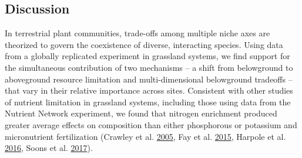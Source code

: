 \documentclass[twoside,12pt,final]{ucthesis-CA2012}
\begin{document}
\begin{ucmainmatter}
{\section{Discussion}\label{discussion}}

In terrestrial plant communities, trade-offs among multiple niche axes are theorized to govern the coexistence of diverse, interacting species. Using data from a globally replicated experiment in grassland systems, we find support for the simultaneous contribution of two mechanisms -- a shift from belowground to aboveground resource limitation and multi-dimensional belowground tradeoffs -- that vary in their relative importance across sites.
Consistent with other studies of nutrient limitation in grassland systems, including those using data from the Nutrient Network experiment, we found that nitrogen enrichment produced greater average effects on composition than either phosphorous or potassium and micronutrient fertilization (Crawley et al. \protect\hyperlink{ref-Crawley2005}{2005}, Fay et al. \protect\hyperlink{ref-Fay2015}{2015}, Harpole et al. \protect\hyperlink{ref-Harpole2016}{2016}, Soons et al. \protect\hyperlink{ref-Soons2017}{2017}).


\end{ucmainmatter}
\end{document}

